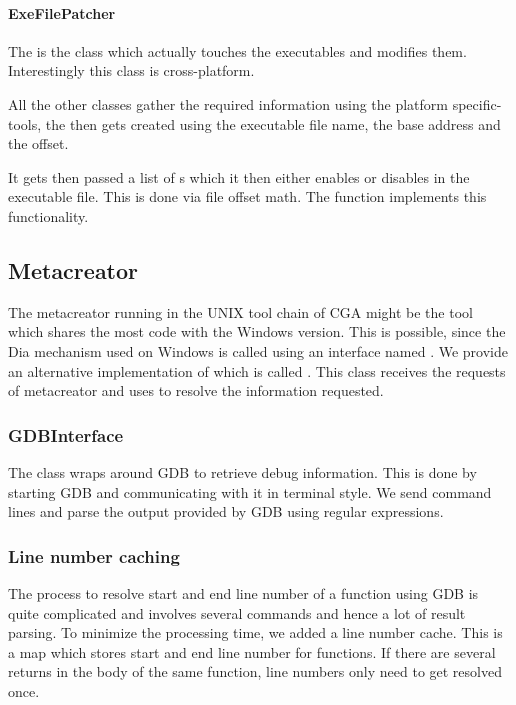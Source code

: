 \paragraph{ExeFilePatcher}

The  is the class which actually touches the executables and modifies them.  Interestingly this class is cross-platform.

All the other classes gather the required information using the platform specific-tools, the  then gets created using the executable file name, the base address and the offset.

It gets then passed a list of s which it then either enables or disables in the executable file.  This is done via file offset math.
The function  implements this functionality.

% 
% 
% 




\subsection{Metacreator} The metacreator running in the UNIX tool chain of CGA might be the tool which shares the most code with the Windows version. This is possible, since the Dia mechanism used on Windows is called using an interface named . We provide an alternative implementation of  which is called . This class receives the requests of metacreator and uses  to resolve the information requested.

\subsubsection{GDBInterface} The  class wraps around GDB to retrieve debug information. This is done by starting GDB and communicating with it in terminal style. We send command lines and parse the output provided by GDB using regular expressions. 

\subsubsection{Line number caching} The process to resolve start and end line number of a function using GDB is quite complicated and involves several commands and hence a lot of result parsing. To minimize the processing time, we added a line number cache. This is a map which stores start and end line number for functions. If there are several returns in the body of the same function, line numbers only need to get resolved once.
